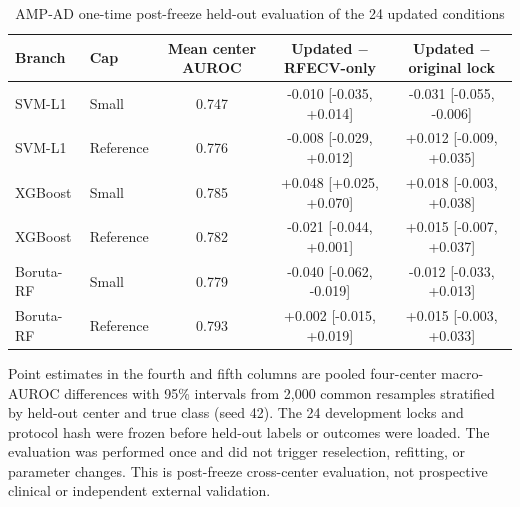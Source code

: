 \begin{table}[p]
\centering
\caption{AMP-AD one-time post-freeze held-out evaluation of the 24 updated conditions}
\label{tab:supp22}
\scriptsize
\begin{tabular}{llccc}
\toprule
Branch & Cap & Mean center AUROC & Updated $-$ RFECV-only & Updated $-$ original lock \\
\midrule
SVM-L1 & Small & 0.747 & -0.010 [-0.035, +0.014] & -0.031 [-0.055, -0.006] \\
SVM-L1 & Reference & 0.776 & -0.008 [-0.029, +0.012] & +0.012 [-0.009, +0.035] \\
XGBoost & Small & 0.785 & +0.048 [+0.025, +0.070] & +0.018 [-0.003, +0.038] \\
XGBoost & Reference & 0.782 & -0.021 [-0.044, +0.001] & +0.015 [-0.007, +0.037] \\
Boruta-RF & Small & 0.779 & -0.040 [-0.062, -0.019] & -0.012 [-0.033, +0.013] \\
Boruta-RF & Reference & 0.793 & +0.002 [-0.015, +0.019] & +0.015 [-0.003, +0.033] \\
\bottomrule
\end{tabular}
\begin{minipage}{0.98\linewidth}\scriptsize\vspace{0.3em}
Point estimates in the fourth and fifth columns are pooled four-center macro-AUROC differences with 95\% intervals from 2,000 common resamples stratified by held-out center and true class (seed 42). The 24 development locks and protocol hash were frozen before held-out labels or outcomes were loaded. The evaluation was performed once and did not trigger reselection, refitting, or parameter changes. This is post-freeze cross-center evaluation, not prospective clinical or independent external validation.
\end{minipage}
\end{table}
